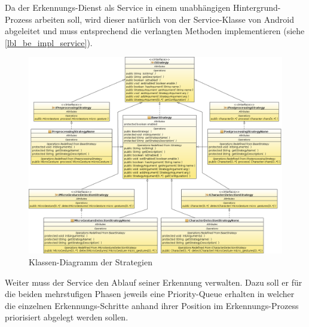 Da der Erkennungs-Dienst als Service in einem unabhängigen Hintergrund-Prozess arbeiten soll, wird dieser natürlich von der Service-Klasse von Android abgeleitet und muss entsprechend die verlangten Methoden implementieren (siehe \ref{lbl_be_impl_service}).

\begin{figure}[h]
   \centering
   \includegraphics[width=\textwidth]{img/uml_cd_strategies} 
   \caption{Klassen-Diagramm der Strategien}
   \label{fig:cl_strategies}
\end{figure}

Weiter muss der Service den Ablauf seiner Erkennung verwalten. Dazu soll er für die beiden mehrstufigen Phasen jeweils eine Priority-Queue erhalten in welcher die einzelnen Erkennungs-Schritte anhand ihrer Position im Erkennungs-Prozess priorisiert abgelegt werden sollen.

